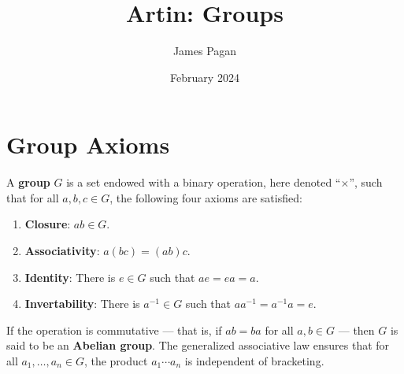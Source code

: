 \documentclass[11pt]{article}
\title{Artin: Groups}
\author{James Pagan}
\date{February 2024}
\begin{document}
\maketitle
\tableofcontents
\newpage


\section{Group Axioms}

A \textbf{group} $G$ is a set endowed with a binary operation, here denoted ``$\times$'', such that for all $a, b, c \in G$, the following four axioms are satisfied:
\begin{enumerate}
  \item \textbf{Closure}: $ab \in G$.
  \item \textbf{Associativity}: $a(bc) = (ab)c$.
  \item \textbf{Identity}: There is $e \in G$ such that $ae = ea = a$.
  \item \textbf{Invertability}: There is $a^{-1} \in G$ such that $aa^{-1} = a^{-1}a = e$.
\end{enumerate}

If the operation is commutative --- that is, if $ab = ba$ for all $a, b \in G$ --- then $G$ is said to be an \textbf{Abelian group}. The generalized associative law ensures that for all $a_{1}, \ldots, a_{n} \in G$, the product $a_{1} \cdots a_{n}$ is independent of bracketing.
\end{document}
